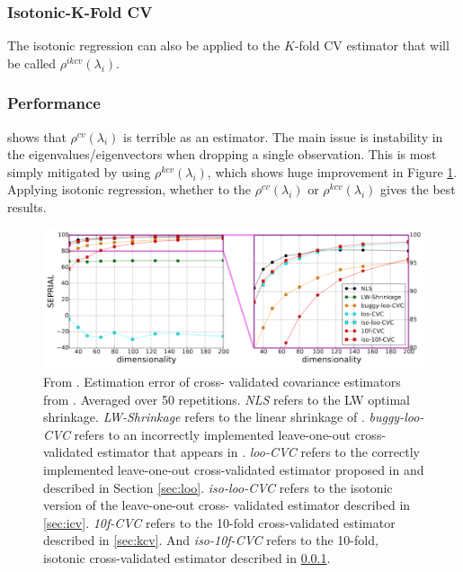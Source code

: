 \documentclass{article}
\begin{document}
\subsubsection{Isotonic-K-Fold CV}\label{sec:ikcv}

The isotonic regression can also be applied to the $K$-fold CV estimator that
will be called $\rho^{ikcv}(\lambda_i)$.

\subsubsection{Performance}

\cite{Bartz2016CrossValidation} shows that $\rho^{cv}(\lambda_i)$ is terrible as
an estimator.  The main issue is instability in the eigenvalues/eigenvectors
when dropping a single observation.  This is most simply mitigated by using
$\rho^{kcv}(\lambda_i)$, which shows huge improvement in Figure \ref{fig:cv}.
Applying isotonic regression, whether to the $\rho^{cv}(\lambda_i)$ or
$\rho^{kcv}(\lambda_i)$ gives the best results.


	\begin{figure}[htbp]
		\centering
		\includegraphics[width=6in]{cv.png}
		\caption{
			From \cite{Bartz2016CrossValidation}.  Estimation error of cross-
			validated covariance estimators from \cite{Bartz2016CrossValidation}.
			Averaged over 50 repetitions.  \emph{NLS} refers to the LW optimal
			shrinkage. \emph{LW-Shrinkage} refers to the linear shrinkage of
			\cite{Ledoit2004WellConditioned}. \emph{buggy-loo-CVC} refers to an
			incorrectly implemented leave-one-out cross-validated estimator that
			appears in \cite{Ledoit2012Nonlinear}. \emph{loo-CVC} refers to the
			correctly implemented leave-one-out cross-validated estimator proposed in
			\cite{Ledoit2012Nonlinear} and described in Section \ref{sec:loo}. \emph
			{iso-loo-CVC} refers to the isotonic version of the leave-one-out cross-
			validated estimator described in \ref{sec:icv}.  \emph {10f-CVC} refers to
			the 10-fold cross-validated estimator described in \ref{sec:kcv}.  And
			\emph{iso-10f-CVC} refers to the 10-fold, isotonic cross-validated
			estimator described in \ref{sec:ikcv}. }
		\label{fig:cv}
	\end{figure}
\end{document}

